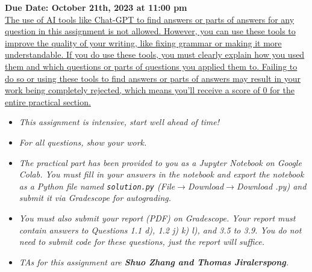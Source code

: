 \documentclass[12pt]{article}
\theoremstyle{definition}
\begin{document}
\fancyhead{}
\fancyfoot{}


\vspace{1cm}

\shorthandoff{:}
{\textbf{Due Date: October 21th, 2023 at 11:00 pm}}\\

\vspace{-0.5cm}
\uline{The use of AI tools like Chat-GPT to find answers or parts of answers for any question in this assignment is not allowed. However, you can use these tools to improve the quality of your writing, like fixing grammar or making it more understandable. If you do use these tools, you must clearly explain how you used them and which questions or parts of questions you applied them to. Failing to do so or using these tools to find answers or parts of answers may result in your work being completely rejected, which means you'll receive a score of 0 for the entire practical section.}


\renewcommand{\labelitemi}{\textbullet}

\begin{itemize}
\item \emph{This assignment is intensive, start well ahead of time!}
\item \emph{For all questions, show your work.}
\item \emph{The practical part has been provided to you as a Jupyter Notebook on Google Colab. You must fill in your answers in the notebook and export the notebook as a Python file named \texttt{solution.py} (File$\xrightarrow{}$Download$\xrightarrow{}$Download .py) and submit it via Gradescope for autograding.}
\item \emph{You must also submit your report (PDF) on Gradescope. Your report must contain answers to Questions 1.1 d), 1.2 j) k) l), and 3.5 to 3.9. You do not need to submit code for these questions, just the report will suffice.}
\item \emph{TAs for this assignment are \textbf{Shuo Zhang and Thomas Jiralerspong}.}
\end{itemize}
\vspace{0.2cm}
\end{document}
